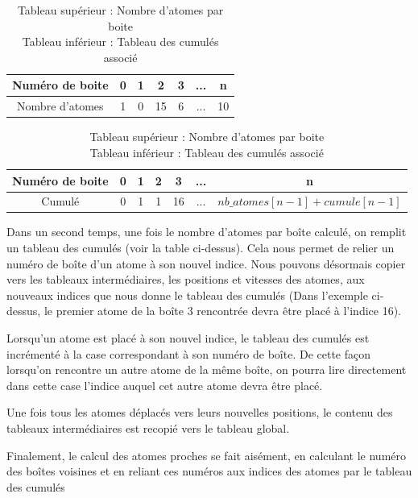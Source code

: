 \begin{table}[!h]
\centering
\begin{minipage}{\linewidth}
\centering
\begin{tabular}{|c|c|c|c|c|c|c|}
  \hline
  Numéro de boite & 0 & 1 & 2 & 3 & ...&  n \\
  \hline
  Nombre d'atomes & 1 & 0 & 15 & 6 & ... & 10 \\
  \hline
\end{tabular}
\end{minipage}

\begin{minipage}{\linewidth}
\centering
\begin{tabular}{|c|c|c|c|c|c|c|}
  \hline
  Numéro de boite & 0 & 1 & 2 & 3 & ... & n \\
  \hline
  Cumulé & 0 & 1 & 1 & 16 & ... & $nb\_atomes[n-1]+cumule[n-1]$ \\
  \hline
\end{tabular}
\end{minipage}
\caption{Tableau supérieur : Nombre d'atomes par boite \\
        Tableau inférieur : Tableau des cumulés associé}
\end{table}

Dans un second temps, une fois le nombre d'atomes par boîte calculé, on remplit un tableau des cumulés (voir la table ci-dessus). Cela nous permet de relier un numéro de boîte d'un atome à son nouvel indice. Nous pouvons désormais copier vers les tableaux intermédiaires, les positions et vitesses des atomes, aux nouveaux indices que nous donne le tableau des cumulés (Dans l'exemple ci-dessus, le premier atome de la boîte 3 rencontrée devra être placé à l'indice 16).

Lorsqu'un atome est placé à son nouvel indice, le tableau des cumulés est incrémenté à la case correspondant à son numéro de boîte. De cette façon lorsqu'on rencontre un autre atome de la même boîte, on pourra lire directement dans cette case l'indice auquel cet autre atome devra être placé.


Une fois tous les atomes déplacés vers leurs nouvelles positions, le contenu des tableaux intermédiaires est recopié vers le tableau global.

Finalement, le calcul des atomes proches se fait aisément, en calculant le numéro des boîtes voisines et en reliant ces numéros aux indices des atomes par le tableau des cumulés 



